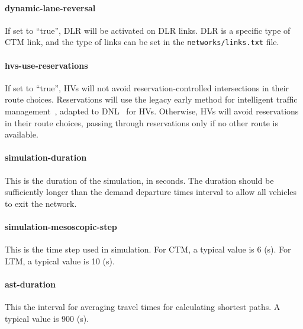 \paragraph*{dynamic-lane-reversal}
If set to ``true'', DLR will be activated on DLR links. DLR is a specific type of CTM link, and the type of links can be set in the \texttt{networks/links.txt} file.

\paragraph*{hvs-use-reservations}
If set to ``true'', HVs will not avoid reservation-controlled intersections in their route choices. Reservations will use the legacy early method for intelligent traffic management~\cite{conde2013intelligent}, adapted to DNL~\cite{levin2016multiclass} for HVs. Otherwise, HVs will avoid reservations in their route choices, passing through reservations only if no other route is available.

\paragraph*{simulation-duration}
This is the duration of the simulation, in seconds. The duration should be sufficiently longer than the demand departure times interval to allow all vehicles to exit the network.

\paragraph*{simulation-mesoscopic-step}
This is the time step used in simulation. For CTM, a typical value is 6 (s). For LTM, a typical value is 10 (s).

\paragraph*{ast-duration}
This the interval for averaging travel times for calculating shortest paths. A typical value is 900 (s).










